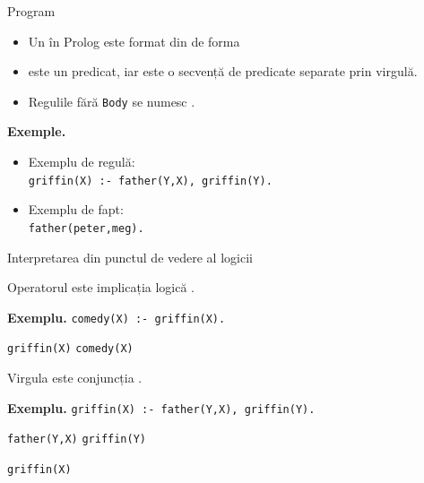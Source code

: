 \documentclass[xcolor=pdftex,romanian,colorlinks]{beamer}
\begin{document}
\begin{frame}{Program }

\begin{itemize}
	\item Un  în Prolog este format din  de forma
	\begin{center}
	\end{center} 
	\medskip
	
\item {} este un predicat, iar  este o secvență de predicate separate prin virgulă.

\medskip
	
\item Regulile fără \texttt{Body} se numesc .
\end{itemize}

\medskip  
\textbf{\color{True} Exemple.}
\vspace{-.2cm}
\begin{itemize}
	\item  Exemplu de regulă: \\ \texttt{griffin(X) :- father(Y,X),  griffin(Y).}
	\item  Exemplu de fapt: \\ \texttt{father(peter,meg).}
\end{itemize}

\end{frame}


\begin{frame}{Interpretarea din punctul de vedere al logicii}

Operatorul \intens{\textbf{:-}} este implicația logică \intens{$\leftarrow$}.

\vspace{.2cm}
\textbf{\color{True} Exemplu.}
\texttt{comedy(X) :- griffin(X).}
\smallskip

 \texttt{griffin(X)}  
\texttt{comedy(X)} 

 
\vspace{.6cm}
Virgula \intens{,} este conjuncția \intens{$\wedge$}.

\vspace{.2cm}
\textbf{\color{True} Exemplu.}
\texttt{griffin(X) :- father(Y,X),  griffin(Y).}

\smallskip

 \texttt{father(Y,X)}  \texttt{griffin(Y)}  

 \texttt{griffin(X)} 
\end{frame}
\end{document}
